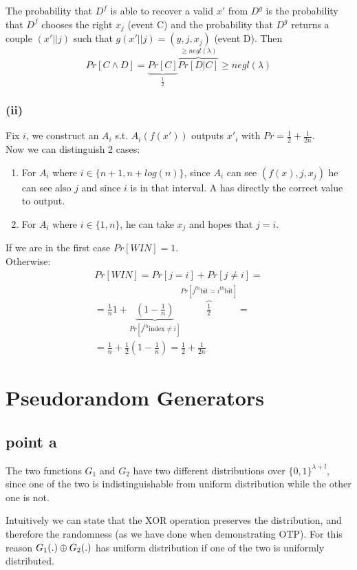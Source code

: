 \documentclass[11pt]{article}
\newcounter{t0d0_counter}
\begin{document}
The probability that $D^f$ is able to recover a valid $x'$ from $D^g$ is the probability that $D^f$ chooses the right $x_j$ (event C) and the probability that $D^g$ returns a couple $(x'||j)$ such that $g(x'||j)=(y,j,x_j)$ (event D). Then \[
Pr[C\wedge D]=\underbrace{Pr[C]}_{\frac{1}{2}}\overbrace{Pr[D|C]}^{\geq negl(\lambda)}\geq negl(\lambda)
\]

\subsubsection{(ii)}

Fix $i$, we construct an $A_i$ s.t. $A_i(f(x\prime))$ outputs $x\prime _i$ with $Pr=\frac{1}{2}+\frac{1}{2n}$.\\
Now we can distinguish 2 cases:
\begin{enumerate}
   \item For $A_i$ where $i \in \{n+1, n+log(n)\}$, since $A_i$ can see $(f(x),j,x_j)$ he can see also $j$ and since $i$ is in that interval. A has directly the correct value to output.
   \item For $A_i$ where $i \in \{1, n\}$, he can take $x_j$ and hopes that $j=i$.
\end{enumerate}

\noindent If we are in the first case $Pr[WIN]=1$.\\
Otherwise: \\
\begin{gather*}
   Pr[WIN]=Pr[j=i]+Pr[j \neq i]=\\
   =\frac{1}{n}1 +\underbrace{(1-\frac{1}{n})}_{Pr[j^{th} \text{index} \neq i]}\overbrace{\frac{1}{2}}^{Pr[j^{th}\text{bit}=i^{th}\text{bit}]}=\\
   =\frac{1}{n}+\frac{1}{2}(1-\frac{1}{n})=\frac{1}{2}+\frac{1}{2n}
\end{gather*}

\newpage
\section{Pseudorandom Generators}
\subsection{point a}

The two functions $G_{1}$ and $G_{2}$ have two different distributions over
$\{0,1\}^{\lambda + l}$, since one of the two is indistinguishable from uniform
distribution while the other one is not.

Intuitively we can state that the XOR operation preserves the distribution, and therefore the randomness (as we have done when demonstrating OTP). For this reason $G_{1}(.) \oplus G_{2}(.)$ has uniform distribution if one of the two is uniformly distributed.
\end{document}
